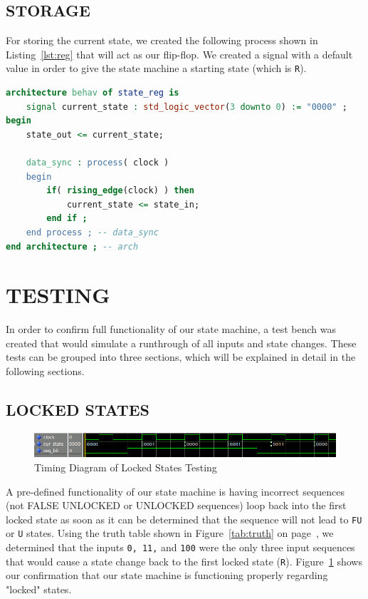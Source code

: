 \documentclass[paper=a4, fontsize=11pt,twoside]{scrartcl}
\begin{document}
	\subsection{STORAGE} %
	\label{sub:storage}
	For storing the current state, we created the following process shown in Listing~\ref{lst:reg} that will act as our flip-flop. We created a signal with a default value in order to give the state machine a starting state (which is \texttt{R}).
	\begin{oframed}
	\begin{lstlisting}[caption={"Flip Flop" Code},label={lst:reg},language=VHDL]
architecture behav of state_reg is
	signal current_state : std_logic_vector(3 downto 0) := "0000" ;
begin
	state_out <= current_state;

	data_sync : process( clock )
	begin
		if( rising_edge(clock) ) then
			current_state <= state_in;
		end if ;
	end process ; -- data_sync
end architecture ; -- arch
	\end{lstlisting}
	\end{oframed}

\section{TESTING} %
\label{sec:testing}
In order to confirm full functionality of our state machine, a test bench was created that would simulate a runthrough of all inputs and state changes. These tests can be grouped into three sections, which will be explained in detail in the following sections.
	\subsection{LOCKED STATES} %
	\label{sub:locked_states}
	\begin{figure}[h]
		\centering
		\includegraphics[scale=1.3]{LOCK.png}
		\caption{Timing Diagram of Locked States Testing}
		\label{fig:lock_t}
	\end{figure}
	A pre-defined functionality of our state machine is having incorrect sequences (not FALSE UNLOCKED or UNLOCKED sequences) loop back into the first locked state as soon as it can be determined that the sequence will not lead to \texttt{FU} or \texttt{U} states. Using the truth table shown in Figure~\ref{tab:truth} on page~\pageref{tab:truth}, we determined that the inputs \texttt{0, 11,} and \texttt{100} were the only three input sequences that would cause a state change back to the first locked state (\texttt{R}). Figure~\ref{fig:lock_t} shows our confirmation that our state machine is functioning properly regarding "locked" states.
\end{document}

